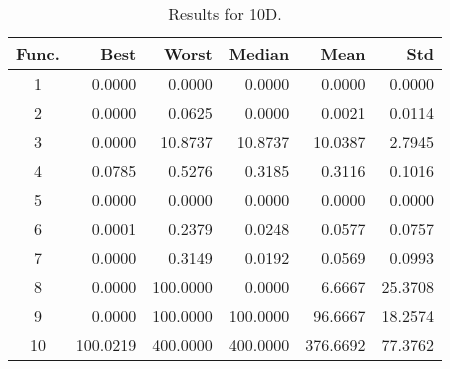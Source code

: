 \begin{table}[ht]
\centering
\caption{ Results for 10D. }
\label{tab:10D}
\begin{tabular}{crrrrr}
\hline
{Func.} & Best & Worst & Median & Mean & Std \\
\hline
1 & 0.0000 & 0.0000 & 0.0000 & 0.0000 & 0.0000 \\
2 & 0.0000 & 0.0625 & 0.0000 & 0.0021 & 0.0114 \\
3 & 0.0000 & 10.8737 & 10.8737 & 10.0387 & 2.7945 \\
4 & 0.0785 & 0.5276 & 0.3185 & 0.3116 & 0.1016 \\
5 & 0.0000 & 0.0000 & 0.0000 & 0.0000 & 0.0000 \\
6 & 0.0001 & 0.2379 & 0.0248 & 0.0577 & 0.0757 \\
7 & 0.0000 & 0.3149 & 0.0192 & 0.0569 & 0.0993 \\
8 & 0.0000 & 100.0000 & 0.0000 & 6.6667 & 25.3708 \\
9 & 0.0000 & 100.0000 & 100.0000 & 96.6667 & 18.2574 \\
10 & 100.0219 & 400.0000 & 400.0000 & 376.6692 & 77.3762 \\
\hline
\end{tabular}
\end{table}
